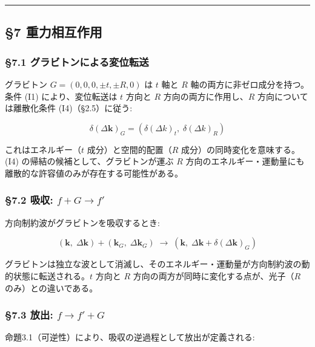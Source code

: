 \documentclass[
  a4paper,11pt]{ltjsarticle}
\theoremstyle{definition}
\theoremstyle{remark}
\begin{document}
\begin{center}\rule{0.5\linewidth}{0.5pt}\end{center}

\subsection{§7 重力相互作用}\label{ux91cdux529bux76f8ux4e92ux4f5cux7528}

\subsubsection{§7.1
グラビトンによる変位転送}\label{ux30b0ux30e9ux30d3ux30c8ux30f3ux306bux3088ux308bux5909ux4f4dux8ee2ux9001}

グラビトン \(G = (0, 0, 0, \pm t, \pm R, 0)\) は \(t\) 軸と \(R\)
軸の両方に非ゼロ成分を持つ。条件 (I1) により、変位転送は \(t\) 方向と
\(R\) 方向の両方に作用し、\(R\) 方向については離散化条件
(I4)（§2.5）に従う:

\[\delta(\Delta\mathbf{k})_G = (\delta(\Delta k)_t,\; \delta(\Delta k)_R)\]

これはエネルギー（\(t\) 成分）と空間的配置（\(R\)
成分）の同時変化を意味する。(I4) の帰結の候補として、グラビトンが運ぶ
\(R\)
方向のエネルギー・運動量にも離散的な許容値のみが存在する可能性がある。

\subsubsection{\texorpdfstring{§7.2 吸収:
\(f + G \to f'\)}{§7.2 吸収: f + G \textbackslash to f\textquotesingle{}}}\label{ux5438ux53ce-f-g-to-f}

方向制約波がグラビトンを吸収するとき:

\[(\mathbf{k},\; \Delta\mathbf{k}) + (\mathbf{k}_G,\; \Delta\mathbf{k}_G) \;\longrightarrow\; (\mathbf{k},\; \Delta\mathbf{k} + \delta(\Delta\mathbf{k})_G)\]

グラビトンは独立な波として消滅し、そのエネルギー・運動量が方向制約波の動的状態に転送される。\(t\)
方向と \(R\) 方向の両方が同時に変化する点が、光子（\(R\)
のみ）との違いである。

\subsubsection{\texorpdfstring{§7.3 放出:
\(f \to f' + G\)}{§7.3 放出: f \textbackslash to f\textquotesingle{} + G}}\label{ux653eux51fa-f-to-f-g}

命題3.1（可逆性）により、吸収の逆過程として放出が定義される:
\end{document}
